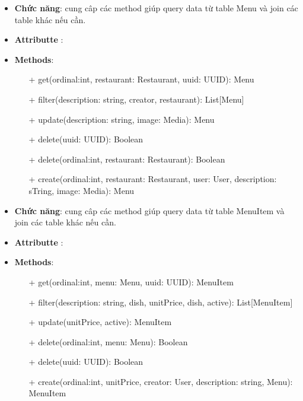\begin{itemize}
    \item \textbf{Chức năng}:  cung câp các method giúp query data từ table Menu và join các table khác nếu cần.
    \item \textbf{Attributte} :
    \item \textbf{Methods}:
    \begin{itemize}
        \item[+] get(ordinal:int, restaurant: Restaurant, uuid: UUID): Menu
        \item[+] filter(description: string, creator, restaurant): List[Menu]
        \item[+] update(description: string, image: Media): Menu
        \item[+] delete(uuid: UUID): Boolean
        \item[+] delete(ordinal:int, restaurant: Restaurant): Boolean
        \item[+] create(ordinal:int, restaurant: Restaurant, user: User, description: sTring, image: Media): Menu
    \end{itemize}
\end{itemize}
\begin{itemize}
    \item \textbf{Chức năng}:  cung câp các method giúp query data từ table MenuItem và join các table khác nếu cần.
    \item \textbf{Attributte} :
    \item \textbf{Methods}:
    \begin{itemize}
        \item[+] get(ordinal:int, menu: Menu, uuid: UUID): MenuItem
        \item[+] filter(description: string, dish, unitPrice, dish, active): List[MenuItem]
        \item[+] update(unitPrice, active): MenuItem
        \item[+] delete(ordinal:int, menu: Menu): Boolean
        \item[+] delete(uuid: UUID): Boolean
        \item[+] create(ordinal:int, unitPrice, creator: User, description: string, Menu): MenuItem
    \end{itemize}
\end{itemize}
